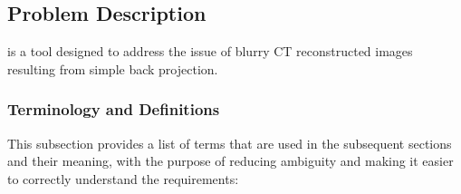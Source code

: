 \documentclass[12pt]{article}
\begin{document}
\subsection{Problem Description} \label{Sec_pd}

\progname{} is a tool designed to address the issue of blurry CT reconstructed
images resulting from simple back projection.

\subsubsection{Terminology and  Definitions} \label{term}
This subsection provides a list of terms that are used in the subsequent
sections and their meaning, with the purpose of reducing ambiguity and making it
easier to correctly understand the requirements:
\end{document}
